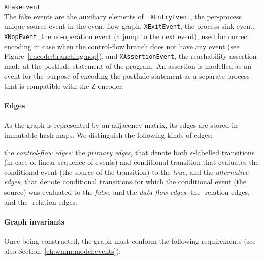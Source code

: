 \begin{outline}
  \1 \texttt{XFakeEvent} \\
    The fake events are the auxiliary elements of \xgraph{}.
    \2 \texttt{XEntryEvent}, the per-process unique source event in the event-flow graph,
    \2 \texttt{XExitEvent}, the process sink event,
    \2 \texttt{XNopEvent}, the no-operation event (a jump to the next event), used for correct encoding in case when the control-flow branch does not have any event (see Figure~\ref{encode:branching:nop}), and
    \2 \texttt{XAssertionEvent}, the reachability assertion made at the postlude statement of the program.
    An assertion is modelled as an event for the purpose of encoding the postlude statement as a separate process that is compatible with the Z-encoder.

\end{outline}


\paragraph{Edges}
As the graph is represented by an adjacency matrix, its edges are stored in immutable hash-maps.
We distinguish the following kinds of edges:

\begin{outline}
  \1 the \textit{control-flow edges}:
    \2 the \textit{primary edges}, that denote both $\epsilon$-labelled transitions (in case of linear sequence of events) and conditional transition that evaluates the conditional event (the source of the transition) to the \textit{true}, and
    \2 the \textit{alternative edges}, that denote conditional transitions for which the conditional event (the source) was evaluated to the \textit{false}; and
  \1 the \textit{data-flow edges}:
    \2 the \co{}-relation edges, and 
    \2 the \rf{}-relation edges.
\end{outline}



\paragraph{Graph invariants}
Once being constructed, the graph must conform the following requirements (see also Section~\ref{ch:wmm:model:events}):

